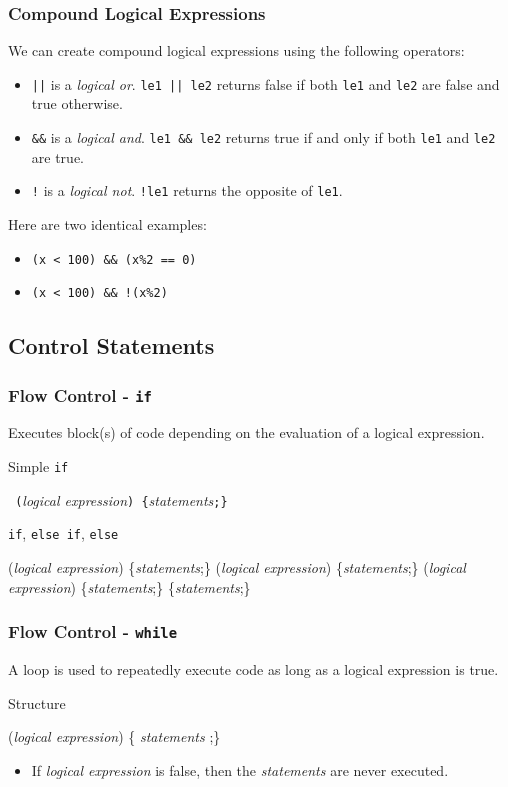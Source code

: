 \documentclass[smaller,table]{beamer} %
\begin{document}
\begin{frame}
\frametitle{Compound Logical Expressions}
We can create compound logical expressions using the following operators:
\begin{itemize}
 \item {\tt ||} is a \emph{logical or}. {\tt le1 || le2} returns false if both {\tt le1} and {\tt le2} are false and true otherwise.
 \item {\tt \&\&} is a \emph{logical and}. {\tt le1 \&\& le2} returns true if and only if both {\tt le1} and {\tt le2} are true.
 \item {\tt !} is a \emph{logical not}. {\tt !le1} returns the opposite of {\tt le1}.
\end{itemize}
Here are two identical examples:
\begin{itemize}
\item \tt (x < 100) \&\& (x\%2 == 0)\\
\item \tt (x < 100) \&\& !(x\%2)
\end{itemize}
\end{frame}

\subsection{Control Statements}
\begin{frame}[fragile]
\frametitle{Flow Control - {\tt if}}
Executes block(s) of code depending on the evaluation of a logical expression.
\begin{block}{Simple {\tt if}}
\begin{center}{\tt {} (}\emph{logical expression}{\tt ) \{}\emph{statements}{\tt ;\}}\end{center}
\end{block}

\begin{block}{{\tt if}, {\tt else if}, {\tt else}}
\begin{semiverbatim}
    (\emph{logical expression})
      \{\emph{statements};\}
    (\emph{logical expression})
      \{\emph{statements};\}
    (\emph{logical expression})
      \{\emph{statements};\}
      \{\emph{statements};\}
\end{semiverbatim}
\end{block}
\end{frame}

\begin{frame}[fragile]
\frametitle{Flow Control - {\tt while}}
A  loop is used to repeatedly execute code as long as a logical expression is true.

\begin{block}{Structure}
\begin{semiverbatim}
    (\emph{logical expression})
      \{ \emph{statements} ;\}
\end{semiverbatim}
\end{block}
\begin{itemize}
\item If \emph{logical expression} is false, then the \emph{statements} are never executed.
\end{itemize}
\end{frame}
\end{document}
